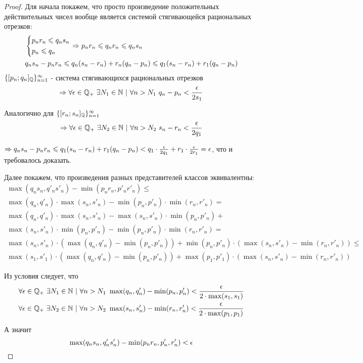 \begin{proof}
    Для начала покажем, что просто произведение положительных действительных чисел вообще является системой стягивающейся рациональных отрезков:
    \begin{align*}
        &\left\{\begin{aligned}
        &p_n r_n \leqslant q_n s_n \\ 
        &p_n \leqslant q_n
        \end{aligned}\right. 
        \Rightarrow p_n r_n \leqslant q_n r_n \leqslant q_n s_n \\
        &q_n s_n - p_n r_n \leqslant q_n (s_n - r_n) + r_n (q_n - p_n) \leqslant q_1 (s_n - r_n) + r_1 (q_n - p_n)
    \end{align*}
    $\{[p_n; q_n]_{\mathbb{Q}}\}_{n = 1}^\infty$ - система стягивающихся рациональных отрезков
    $$
    \ra \forall \veps \in \Q_+\ \exists N_1 \in \N\ |\ \forall n > N_1\ q_n - p_n < \frac{\veps}{2s_1}
    $$
    
    Аналогично для $\{[r_n; s_n]_{\mathbb{Q}}\}_{n = 1}^\infty$
    $$
    \Rightarrow \forall \epsilon \in \mathbb{Q}_+\ \exists N_2 \in \mathbb{N}\ |\ \forall n > N_2\ s_n - r_n < \frac{\epsilon}{2q_1}
    $$
    
    $\Rightarrow q_n s_n - p_n r_n \leqslant q_1 (s_n - r_n) + r_1 (q_n - p_n) < q_1 \cdot \frac{\epsilon}{2q_1} + r_1 \cdot \frac{\epsilon}{2r_1} = \epsilon$, что и требовалось доказать.
    
    Далее покажем, что произведения разных представителей классов эквивалентны:
    \begin{multline}
        \max(q_n s_n, q'_n s'_n) - \min(p_n r_n, p'_n r'_n) \le \\
        \max(q_n, q'_n) \cdot \max(s_n, s'_n) - \min(p_n, p'_n) \cdot \min(r_n, r'_n) = \\
        \max(q_n, q'_n) \cdot \max(s_n, s'_n) - \max(s_n, s'_n) \cdot \min(p_n, p'_n) + \\
        \max(s_n, s'_n) \cdot \min(p_n, p'_n) - \min(p_n, p'_n) \cdot \min(r_n, r'_n) = \\
        \max(s_n, s'_n) \cdot (\max(q_n, q'_n) - \min(p_n, p'_n)) + \min(p_n, p'_n) \cdot (\max(s_n, s'_n) - \min(r_n, r'_n)) \le \\
        \max(s_1, s'_1) \cdot (\max(q_n, q'_n) - \min(p_n, p'_n)) + \max(p_1, p'_1) \cdot (\max(s_n, s'_n) - \min(r_n, r'_n))
    \end{multline}
    
    Из условия следует, что
    \begin{align*}
        \forall \epsilon \in \mathbb{Q}_+\ \exists N_1 \in \mathbb{N}\ |\ \forall n > N_1\ \max(q_n, q'_n) - \min(p_n, p'_n) < \frac{\epsilon}{2 \cdot \max(s_1, s
        _1)}
        \\
        \forall \epsilon \in \mathbb{Q}_+\ \exists N_2 \in \mathbb{N}\ |\ \forall n > N_2\ \max(s_n, s'_n) - \min(r_n, r'_n) < \frac{\epsilon}{2 \cdot \max(p_1, p
        _1)}
    \end{align*}
    
    А значит
    $$
        \max(q_n s_n, q'_n s'_n) - \min(p_n r_n, p'_n, r'_n) < \epsilon
    $$
\end{proof}

